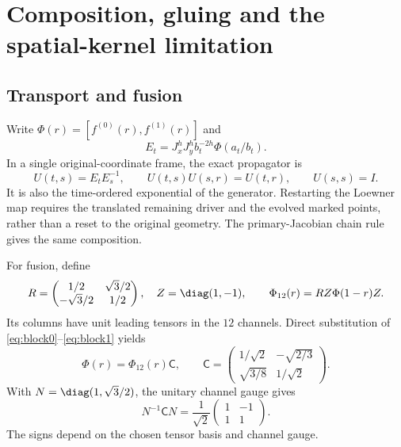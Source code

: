 \section{Composition, gluing and the spatial-kernel limitation}
\label{sec:pairings}

\subsection{Transport and fusion}

Write $\Phi(r)=[f^{(0)}(r),f^{(1)}(r)]$ and
\begin{equation}
 E_t=J_x^hJ_y^h b_t^{-2h}\Phi(a_t/b_t).
\end{equation}
In a single original-coordinate frame, the exact propagator is
\begin{equation}
 U(t,s)=E_tE_s^{-1},\qquad
 U(t,s)U(s,r)=U(t,r),\qquad U(s,s)=I.
 \label{eq:composition}
\end{equation}
It is also the time-ordered exponential of the generator. Restarting the
Loewner map requires the translated remaining driver and the evolved marked
points, rather than a reset to the original geometry. The primary-Jacobian
chain rule gives the same composition.

For fusion, define
\begin{equation}
 R=\begin{pmatrix}1/2&\sqrt3/2\\-\sqrt3/2&1/2\end{pmatrix},\quad
 Z=\diag(1,-1),\qquad \Phi_{12}(r)=RZ\Phi(1-r)Z.
\end{equation}
Its columns have unit leading tensors in the $12$ channels.
Direct substitution of \eqref{eq:block0}--\eqref{eq:block1} yields
\begin{equation}
 \Phi(r)=\Phi_{12}(r)\mathsf C,\qquad
 \mathsf C=\begin{pmatrix}
 1/\sqrt2&-\sqrt{2/3}\\\sqrt{3/8}&1/\sqrt2
 \end{pmatrix}.
\end{equation}
With $N=\diag(1,\sqrt3/2)$, the unitary channel gauge gives
\begin{equation}
 N^{-1}\mathsf C N=\frac1{\sqrt2}
 \begin{pmatrix}1&-1\\1&1\end{pmatrix}.
 \label{eq:unitary_fusion}
\end{equation}
The signs depend on the chosen tensor basis and channel gauge.

